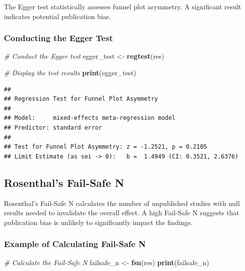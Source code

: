 \documentclass[
]{book}
\newenvironment{Shaded}{\begin{snugshade}}{\end{snugshade}}
\newcommand{\CommentTok}[1]{\textcolor[rgb]{0.56,0.35,0.01}{\textit{#1}}}
\newcommand{\FunctionTok}[1]{\textcolor[rgb]{0.13,0.29,0.53}{\textbf{#1}}}
\newcommand{\NormalTok}[1]{#1}
\newcommand{\OtherTok}[1]{\textcolor[rgb]{0.56,0.35,0.01}{#1}}
\begin{document}
The Egger test statistically assesses funnel plot asymmetry. A significant result indicates potential publication bias.

\subsubsection{Conducting the Egger Test}\label{conducting-the-egger-test}

\begin{Shaded}
\begin{Highlighting}[]
\CommentTok{\# Conduct the Egger test}
\NormalTok{egger\_test }\OtherTok{\textless{}{-}} \FunctionTok{regtest}\NormalTok{(res)}

\CommentTok{\# Display the test results}
\FunctionTok{print}\NormalTok{(egger\_test)}
\end{Highlighting}
\end{Shaded}

\begin{verbatim}
## 
## Regression Test for Funnel Plot Asymmetry
## 
## Model:     mixed-effects meta-regression model
## Predictor: standard error
## 
## Test for Funnel Plot Asymmetry: z = -1.2521, p = 0.2105
## Limit Estimate (as sei -> 0):   b =  1.4949 (CI: 0.3521, 2.6376)
\end{verbatim}

\subsection{Rosenthal's Fail-Safe N}\label{rosenthals-fail-safe-n}

Rosenthal's Fail-Safe N calculates the number of unpublished studies with null results needed to invalidate the overall effect. A high Fail-Safe N suggests that publication bias is unlikely to significantly impact the findings.

\subsubsection{Example of Calculating Fail-Safe N}\label{example-of-calculating-fail-safe-n}

\begin{Shaded}
\begin{Highlighting}[]
\CommentTok{\# Calculate the Fail{-}Safe N}
\NormalTok{failsafe\_n }\OtherTok{\textless{}{-}} \FunctionTok{fsn}\NormalTok{(res)}
\FunctionTok{print}\NormalTok{(failsafe\_n)}
\end{Highlighting}
\end{Shaded}
\end{document}
